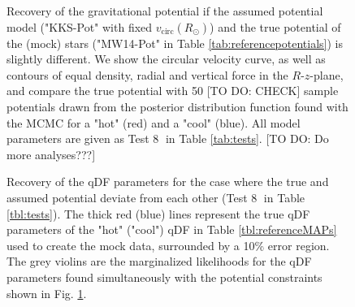 
\begin{figure}
\caption{Recovery of the gravitational potential if the assumed potential model ("KKS-Pot" with fixed $v_\text{circ}(R_\odot)$) and the true potential of the (mock) stars ("MW14-Pot" in Table \ref{tab:referencepotentials}) is slightly different. We show the circular velocity curve, as well as contours of equal density, radial and vertical force in the $R$-$z$-plane, and compare the true potential with 50 [TO DO: CHECK] sample potentials drawn from the posterior distribution function found with the MCMC for a "hot" (red) and a "cool" \MAP (blue). All model parameters are given as Test \textcircled{8} in Table \ref{tab:tests}. [TO DO: Do more analyses???]}
\label{fig:MW14vsKKS2SphFlex}
\end{figure}

\begin{figure}
\caption{Recovery of the qDF parameters for the case where the true and assumed potential deviate from each other (Test \textcircled{8} in Table \ref{tbl:tests}). The thick red (blue) lines represent the true qDF parameters of the "hot" ("cool") qDF in Table \ref{tbl:referenceMAPs} used to create the mock data, surrounded by a 10\% error region. The grey violins are the marginalized likelihoods for the qDF parameters found simultaneously with the potential constraints shown in Fig. \ref{fig:MW14vsKKS2SphFlex}.}
\label{fig:MW14vsKKS2SphFlex_violins}
\end{figure}






